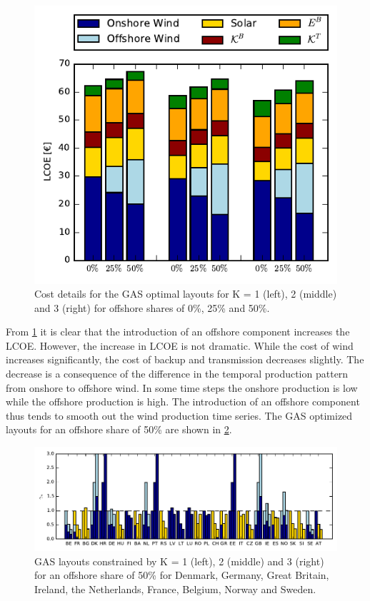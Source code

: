 \documentclass[a4paper, 5p, sort&compress]{elsarticle}%
\begin{document}
{\begin{figure}[h!]
  \centering
  \includegraphics[width = \columnwidth]{costOffshoreVE50}
  \caption{Cost details for the GAS optimal layouts for K = 1 (left),
    2 (middle) and 3 (right) for offshore shares of 0\%, 25\% and 50\%.}
  \label{fig:cost-offshore}
\end{figure}

From \cref{fig:cost-offshore} it is clear that the introduction of an
offshore component increases the LCOE. However, the increase in LCOE
is not dramatic. While the cost of wind increases
significantly, the cost of backup and transmission decreases
slightly. The decrease is a consequence of the difference in the
temporal production pattern from onshore to offshore wind. In some
time steps the onshore production is low while the offshore production
is high. The introduction of an offshore component thus tends to
smooth out the wind production time series. %
The GAS optimized layouts for
an offshore share of 50\% are shown in \cref{fig:layout-offshore}.

\begin{figure}[t!]
  \centering
  \includegraphics[width = 2\columnwidth, center]{offshoreLayouts}
  \caption{GAS layouts constrained by K = 1 (left), 2 (middle) and 3
    (right) for an offshore share of 50\% for Denmark, Germany, Great
    Britain, Ireland, the Netherlands, France, Belgium, Norway and
    Sweden.}
  \label{fig:layout-offshore}
\end{figure}

}
\end{document}
